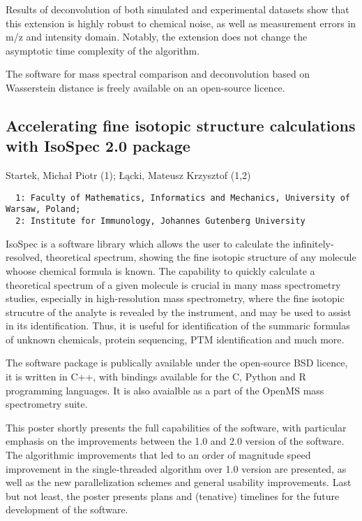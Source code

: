 {Results of deconvolution of both simulated and experimental datasets show that
this extension is highly robust to chemical noise, as well as measurement
errors in m/z and intensity domain. Notably, the extension does not change the
asymptotic time complexity of the algorithm.

The software for mass spectral comparison and deconvolution based on
Wasserstein distance is freely available on an open-source licence.



\subsection*{\color{eubicRed} Accelerating fine isotopic structure calculations with IsoSpec 2.0 package}
{\color{eubicGray}Startek, Michał Piotr (1);
Łącki, Mateusz Krzysztof (1,2)}
{\color{eubicGray}\begin{verbatim}
  1: Faculty of Mathematics, Informatics and Mechanics, University of Warsaw, Poland;
  2: Institute for Immunology, Johannes Gutenberg University
\end{verbatim}}

IsoSpec is a software library which allows the user to calculate the infinitely-resolved, theoretical spectrum, showing the fine isotopic structure of any molecule whoose chemical formula is known. The capability to quickly calculate a theoretical spectrum of a given molecule is crucial in many mass spectrometry studies, especially in high-resolution mass spectrometry, where the fine isotopic strucutre of the analyte is revealed by the instrument, and may be used to assist in its identification. Thus, it is useful for identification of the summaric formulas of unknown chemicals, protein sequencing, PTM identification and much more.

The software package is publically available under the open-source BSD licence, it is written in C++, with bindings available for the C, Python and R programming languages. It is also avaialble as a part of the OpenMS mass spectrometry suite.

This poster shortly presents the full capabilities of the software, with particular emphasis on the improvements between the 1.0 and 2.0 version of the software. The algorithmic improvements that led to an order of magnitude speed improvement in the single-threaded algorithm over 1.0 version are presented, as well as the new parallelization schemes and general usability improvements. Last but not least, the poster presents plans and (tenative) timelines for the future development of the software.


}
